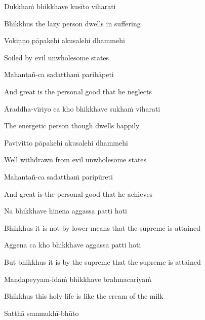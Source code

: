 Dukkhaṁ bhikkhave kusīto viharati

\begin{cprenglish}
  Bhikkhus the lazy person dwells in suffering
\end{cprenglish}

Vokiṇṇo pāpakehi akusalehi dhammehi

\begin{cprenglish}
  Soiled by evil unwholesome states
\end{cprenglish}

Mahantañ-ca sadatthaṁ parihāpeti

\begin{cprenglish}
  And great is the personal good that he neglects
\end{cprenglish}

Āraddha-vīriyo ca kho bhikkhave sukhaṁ viharati

\begin{cprenglish}
  The energetic person though dwells happily
\end{cprenglish}

Pavivitto pāpakehi akusalehi dhammehi

\begin{cprenglish}
  Well withdrawn from evil unwholesome states
\end{cprenglish}

Mahantañ-ca sadatthaṁ paripūreti

\begin{cprenglish}
  And great is the personal good that he achieves
\end{cprenglish}

Na bhikkhave hīnena aggassa patti hoti

\begin{cprenglish}
  Bhikkhus it is not by lower means that the supreme is attained
\end{cprenglish}

Aggena ca kho bhikkhave aggassa patti hoti

\begin{cprenglish}
  But bhikkhus it is by the supreme that the supreme is attained
\end{cprenglish}

Maṇḍapeyyam-idaṁ bhikkhave brahmacariyaṁ

\begin{cprenglish}
  Bhikkhus this holy life is like the cream of the milk
\end{cprenglish}

Satthā sammukhī-bhūto

